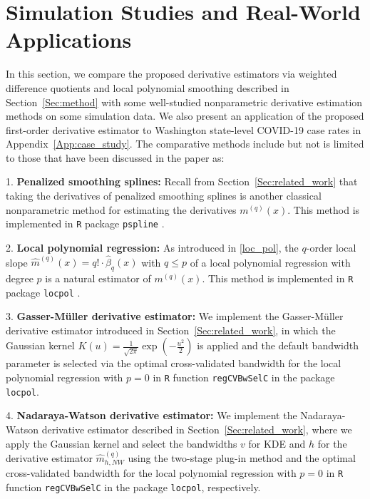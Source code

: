 \documentclass{uwstat572}
\theoremstyle{definition}
\renewcommand{\hat}{\widehat}
\theoremstyle{theorem}
\begin{document}
\section{Simulation Studies and Real-World Applications}
\label{Sec:experiments}

In this section, we compare the proposed derivative estimators via weighted difference quotients and local polynomial smoothing described in Section~\ref{Sec:method} with some well-studied nonparametric derivative estimation methods on some simulation data. We also present an application of the proposed first-order derivative estimator to Washington state-level COVID-19 case rates in Appendix~\ref{App:case_study}. The comparative methods include but not is limited to those that have been discussed in the paper as:
	
1. {\bf Penalized smoothing splines:} Recall from Section~\ref{Sec:related_work} that taking the derivatives of penalized smoothing splines is another classical nonparametric method for estimating the derivatives $m^{(q)}(x)$. This method is implemented in \texttt{R} package \texttt{pspline} \citep{pspline2022R}.

2. {\bf Local polynomial regression:} As introduced in \eqref{loc_pol}, the $q$-order local slope $\hat{m}^{(q)}(x) = q!\cdot\hat{\beta}_q(x)$ with $q\leq p$ of a local polynomial regression with degree $p$ is a natural estimator of $m^{(q)}(x)$. This method is implemented in \texttt{R} package \texttt{locpol} \citep{locpol2022R}.
	
3. {\bf Gasser-M{\"u}ller derivative estimator:} We implement the Gasser-M{\"u}ller derivative estimator introduced in Section~\ref{Sec:related_work}, in which the Gaussian kernel $K(u)=\frac{1}{\sqrt{2\pi}} \exp\left(-\frac{u^2}{2}\right)$ is applied and the default bandwidth parameter is selected via the optimal cross-validated bandwidth for the local polynomial regression with $p=0$ in \texttt{R} function \texttt{regCVBwSelC} in the package \texttt{locpol}.
	
4. {\bf Nadaraya-Watson derivative estimator:} We implement the Nadaraya-Watson derivative estimator described in Section~\ref{Sec:related_work}, where we apply the Gaussian kernel and select the bandwidths $v$ for KDE and $h$ for the derivative estimator $\hat{m}_{h,NW}^{(q)}$ using the two-stage plug-in method \citep{sheather1991reliable} and the optimal cross-validated bandwidth for the local polynomial regression with $p=0$ in \texttt{R} function \texttt{regCVBwSelC} in the package \texttt{locpol}, respectively.
\end{document}

